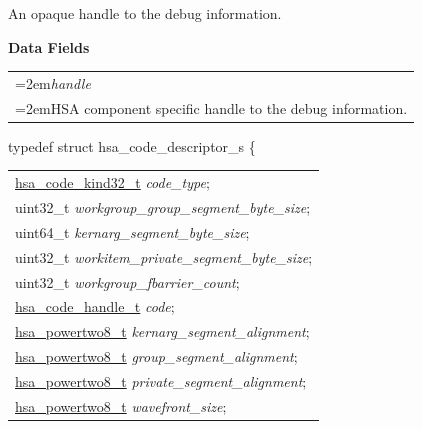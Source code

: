 \documentclass[final]{book}
\newcommand{\reffld}[1]{\textit{#1}}
\begin{document}
\begin{appendices}
\begin{tcolorbox}[breakable,nobeforeafter,arc=0mm,colframe=white,colback=lightgray,left=0mm]
\end{tcolorbox}
An opaque handle to the debug information.

\noindent\textbf{Data Fields}\\[-6mm]
\begin{longtable}{@{}>{\hangindent=2em}p{\textwidth}}
\reffld{handle}\\\hspace{2em}HSA component specific handle to the debug information.
\end{longtable}



\noindent\begin{tcolorbox}[breakable,nobeforeafter,arc=0mm,colframe=white,colback=lightgray,left=0mm]
typedef struct  hsa_code_descriptor_s \{
\vspace{-3.5mm}\begin{longtable}{@{}p{\textwidth}}
\hspace{1.7em}\hyperlink{group--FinalizerCoreApi-1ga690737e41361fee5bcaa682650a7fc49}{hsa_code_kind32_t} \reffld{code_type};\\
\hspace{1.7em}uint32_t \reffld{workgroup_group_segment_byte_size};\\
\hspace{1.7em}uint64_t \reffld{kernarg_segment_byte_size};\\
\hspace{1.7em}uint32_t \reffld{workitem_private_segment_byte_size};\\
\hspace{1.7em}uint32_t \reffld{workgroup_fbarrier_count};\\
\hspace{1.7em}\hyperlink{group--FinalizerCoreApi-1gae2542da5f2c5ae2f21c2f86a594c5309}{hsa_code_handle_t} \reffld{code};\\
\hspace{1.7em}\hyperlink{group--RuntimeCommon-1ga143c7c845aca213614c1d79b65c35a0c}{hsa_powertwo8_t} \reffld{kernarg_segment_alignment};\\
\hspace{1.7em}\hyperlink{group--RuntimeCommon-1ga143c7c845aca213614c1d79b65c35a0c}{hsa_powertwo8_t} \reffld{group_segment_alignment};\\
\hspace{1.7em}\hyperlink{group--RuntimeCommon-1ga143c7c845aca213614c1d79b65c35a0c}{hsa_powertwo8_t} \reffld{private_segment_alignment};\\
\hspace{1.7em}\hyperlink{group--RuntimeCommon-1ga143c7c845aca213614c1d79b65c35a0c}{hsa_powertwo8_t} \reffld{wavefront_size};\\

\end{longtable}
\end{tcolorbox}
\end{appendices}
\end{document}
